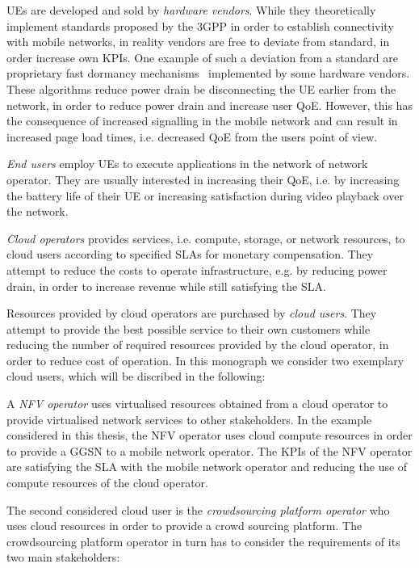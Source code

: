 \glspl{UE} are developed and sold by \emph{hardware vendors}.
While they theoretically implement standards proposed by the \gls{3GPP} in order to establish connectivity with mobile networks, in reality vendors are free to deviate from standard, in order increase own \glspl{KPI}.
One example of such a deviation from a standard are proprietary fast dormancy mechanisms~\cite{GSM2010} implemented by some hardware vendors.
These algorithms reduce power drain be disconnecting the \gls{UE} earlier from the network, in order to reduce power drain and increase user \gls{QoE}.
However, this has the consequence of increased signalling in the mobile network and can result in increased page load times, i.e. decreased \gls{QoE} from the users point of view.

\emph{End users} employ \glspl{UE} to execute applications in the network of network operator. 
They are usually interested in increasing their \gls{QoE}, i.e. by increasing the battery life of their \gls{UE} or increasing satisfaction during video playback over the network.

\emph{Cloud operators} provides services, i.e. compute, storage, or network resources, to cloud users according to specified \glspl{SLA} for monetary compensation. 
They attempt to reduce the costs to operate infrastructure, e.g. by reducing power drain, in order to increase revenue while still satisfying the \gls{SLA}.

Resources provided by cloud operators are purchased by \emph{cloud users}.
They attempt to provide the best possible service to their own customers while reducing the number of required resources provided by the cloud operator, in order to reduce cost of operation. In this monograph we consider two exemplary cloud users, which will be discribed in the following:

A \emph{\gls{NFV} operator} uses virtualised resources obtained from a cloud operator to provide virtualised network services to other stakeholders.
In the example considered in this thesis, the \gls{NFV} operator uses cloud compute resources in order to provide a \gls{GGSN} to a mobile network operator.
The \glspl{KPI} of the \gls{NFV} operator are satisfying the \gls{SLA} with the mobile network operator and reducing the use of compute resources of the cloud operator.

The second considered cloud user is the \emph{crowdsourcing platform operator} who uses cloud resources in order to provide a crowd sourcing platform.
The crowdsourcing platform operator in turn has to consider the requirements of its two main stakeholders:

